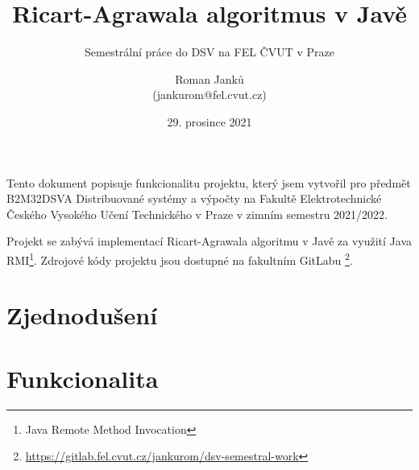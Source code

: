 \documentclass[11pt]{scrartcl}
\title{Ricart-Agrawala algoritmus v Javě}
\subtitle{Semestrální práce do DSV na FEL ČVUT v Praze}
\author{Roman Janků \\ (jankurom@fel.cvut.cz)}
\date{29. prosince 2021}
\begin{document}
    \maketitle

    Tento dokument popisuje funkcionalitu projektu, který jsem vytvořil pro předmět B2M32DSVA Distribuované systémy a
    výpočty na Fakultě Elektrotechnické Českého Vysokého Učení Technického v Praze v zimním semestru 2021/2022.

    Projekt se zabývá implementací Ricart-Agrawala algoritmu v Javě za využití Java RMI\footnote{Java Remote Method
    Invocation}. Zdrojové kódy projektu jsou dostupné na fakultním GitLabu
    \footnote{\url{https://gitlab.fel.cvut.cz/jankurom/dsv-semestral-work}}.

    \section*{Zjednodušení}

    \section*{Funkcionalita }
\end{document}
